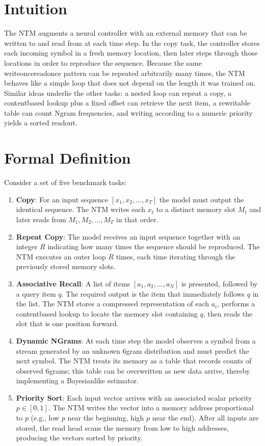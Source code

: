 \documentclass[12pt, a4paper]{article}
\begin{document}
{\section{Intuition}
The NTM augments a neural controller with an external memory that can be written to and read from at each time step.  In the copy task, the controller stores each incoming symbol in a fresh memory location, then later steps through those locations in order to reproduce the sequence.  Because the same writeoncereadonce pattern can be repeated arbitrarily many times, the NTM behaves like a simple loop that does not depend on the length it was trained on.  Similar ideas underlie the other tasks: a nested loop can repeat a copy, a contentbased lookup plus a fixed offset can retrieve the next item, a rewritable table can count Ngram frequencies, and writing according to a numeric priority yields a sorted readout.

\section{Formal Definition}
Consider a set of five benchmark tasks:

\begin{enumerate}
\item \textbf{Copy}:  For an input sequence $[x_{1},x_{2},\dots ,x_{T}]$ the model must output the identical sequence.  The NTM writes each $x_{t}$ to a distinct memory slot $M_{t}$ and later reads from $M_{1},M_{2},\dots ,M_{T}$ in that order.
\item \textbf{Repeat Copy}:  The model receives an input sequence together with an integer $R$ indicating how many times the sequence should be reproduced.  The NTM executes an outer loop $R$ times, each time iterating through the previously stored memory slots.
\item \textbf{Associative Recall}:  A list of items $[a_{1},a_{2},\dots ,a_{N}]$ is presented, followed by a query item $q$.  The required output is the item that immediately follows $q$ in the list.  The NTM stores a compressed representation of each $a_{i}$, performs a contentbased lookup to locate the memory slot containing $q$, then reads the slot that is one position forward.
\item \textbf{Dynamic NGrams}:  At each time step the model observes a symbol from a stream generated by an unknown $6$gram distribution and must predict the next symbol.  The NTM treats its memory as a table that records counts of observed $6$grams; this table can be overwritten as new data arrive, thereby implementing a Bayesianlike estimator.
\item \textbf{Priority Sort}:  Each input vector arrives with an associated scalar priority $p\in[0,1]$.  The NTM writes the vector into a memory address proportional to $p$ (e.g., low $p$ near the beginning, high $p$ near the end).  After all inputs are stored, the read head scans the memory from low to high addresses, producing the vectors sorted by priority.
\end{enumerate}

}
\end{document}

